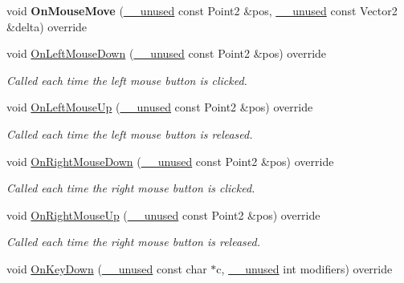 \begin{DoxyCompactItemize}
\mbox{\label{class_graphics_arena_viewer_a74b5c524369a62ba419c89677c646d9e}} 
void {\bfseries On\+Mouse\+Move} (\mbox{\hyperlink{common_8h_a2e3484535ee610c8e19e9859563abe48}{\+\_\+\+\_\+unused}} const Point2 \&pos, \mbox{\hyperlink{common_8h_a2e3484535ee610c8e19e9859563abe48}{\+\_\+\+\_\+unused}} const Vector2 \&delta) override
\item 
void \mbox{\hyperlink{class_graphics_arena_viewer_adf2fb01c3ca8b1774f031d68616b288c}{On\+Left\+Mouse\+Down}} (\mbox{\hyperlink{common_8h_a2e3484535ee610c8e19e9859563abe48}{\+\_\+\+\_\+unused}} const Point2 \&pos) override
\begin{DoxyCompactList}\small\item\em Called each time the left mouse button is clicked. \end{DoxyCompactList}\item 
void \mbox{\hyperlink{class_graphics_arena_viewer_abe4f11ab9bfb6055280ddf2b671d7032}{On\+Left\+Mouse\+Up}} (\mbox{\hyperlink{common_8h_a2e3484535ee610c8e19e9859563abe48}{\+\_\+\+\_\+unused}} const Point2 \&pos) override
\begin{DoxyCompactList}\small\item\em Called each time the left mouse button is released. \end{DoxyCompactList}\item 
void \mbox{\hyperlink{class_graphics_arena_viewer_a178a9f09ff241d4dc032b6d0998cc9c6}{On\+Right\+Mouse\+Down}} (\mbox{\hyperlink{common_8h_a2e3484535ee610c8e19e9859563abe48}{\+\_\+\+\_\+unused}} const Point2 \&pos) override
\begin{DoxyCompactList}\small\item\em Called each time the right mouse button is clicked. \end{DoxyCompactList}\item 
void \mbox{\hyperlink{class_graphics_arena_viewer_a5dfa16dca83575e253b6d3ea344f8746}{On\+Right\+Mouse\+Up}} (\mbox{\hyperlink{common_8h_a2e3484535ee610c8e19e9859563abe48}{\+\_\+\+\_\+unused}} const Point2 \&pos) override
\begin{DoxyCompactList}\small\item\em Called each time the right mouse button is released. \end{DoxyCompactList}\item 
void \mbox{\hyperlink{class_graphics_arena_viewer_ab0001d4a3ebde2b1f5b4cb7770824726}{On\+Key\+Down}} (\mbox{\hyperlink{common_8h_a2e3484535ee610c8e19e9859563abe48}{\+\_\+\+\_\+unused}} const char $\ast$c, \mbox{\hyperlink{common_8h_a2e3484535ee610c8e19e9859563abe48}{\+\_\+\+\_\+unused}} int modifiers) override

\end{DoxyCompactItemize}
